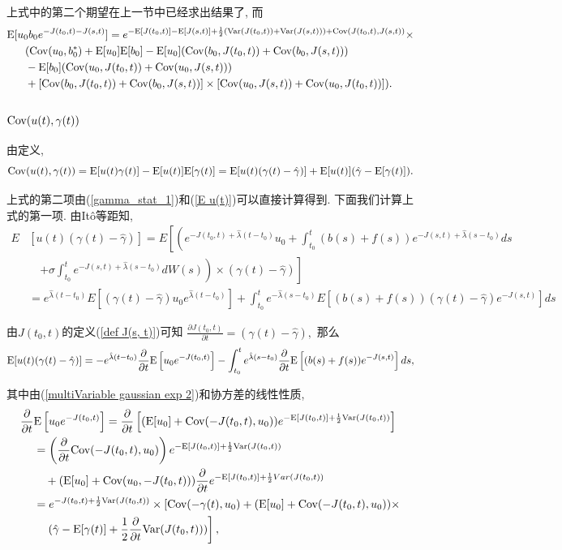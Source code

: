 \documentclass[notitlepage,cs4size,punct,oneside]{ctexrep}
\numberwithin{equation}{section}
\theoremstyle{mystyle}
\begin{document}
上式中的第二个期望在上一节中已经求出结果了, 而
\[
\begin{split}
\text{E}&[u_0b_0e^{-J(t_0, t)-J(s, t)}] = e^{-\text{E}[J(t_0, t)]-\text{E}[J(s, t)]+\frac{1}{2}(\text{Var}(J(t_0, t))+\text{Var}(J(s, t)))+\text{Cov}(J(t_0, t), J(s, t))}\times \\
&\quad (\text{Cov}(u_0, b_0^*)+\text{E}[u_0]\text{E}[b_0]-\text{E}[u_0](\text{Cov}(b_0, J(t_0, t))+\text{Cov}(b_0, J(s, t)))\\
&\quad -\text{E}[b_0](\text{Cov}(u_0, J(t_0, t))+\text{Cov}(u_0, J(s, t)))\\
&\quad +[\text{Cov}(b_0, J(t_0, t))+\text{Cov}(b_0, J(s, t))]\times[\text{Cov}(u_0, J(s, t))+\text{Cov}(u_0, J(t_0, t))]).
\end{split}
\]

\subsubsection{$\text{Cov}(u(t), \gamma(t))$}
由定义,
\[
\text{Cov}(u(t), \gamma(t)) = \text{E}[u(t)\gamma(t)] - \text{E}[u(t)]\text{E}[\gamma(t)] = \text{E}[u(t)(\gamma(t)-\hat\gamma)] + \text{E}[u(t)](\hat\gamma-\text{E}[\gamma(t)]). 
\]

上式的第二项由(\ref{gamma_stat_1})和(\ref{E u(t)})可以直接计算得到. 下面我们计算上式的第一项. 由It\^o等距知,
\[
\begin{split}
E&[u(t)(\gamma(t)-\hat\gamma)] = E\left[\left(e^{-J(t_0, t)+\hat\lambda(t-t_0)}u_0+\int_{t_0}^t(b(s)+f(s))e^{-J(s, t)+\hat\lambda(s-t_0)}ds\right.\right. \\
&\quad \left.\left.+\sigma\int_{t_0}^t e^{-J(s, t)+\hat\lambda(s-t_0)}dW(s)\right)\times(\gamma(t)-\hat\gamma)\right] \\
&= e^{\hat\lambda(t-t_0)}E\left[(\gamma(t)-\hat\gamma)u_0e^{\hat\lambda(t-t_0)}\right]+\int_{t_0}^t e^{-\hat\lambda(s-t_0)}E\left[(b(s)+f(s))(\gamma(t)-\hat\gamma)e^{-J(s, t)}\right]ds
\end{split}
\]

由$J(t_0, t)$的定义(\ref{def J(s, t)})可知
$
\frac{\partial J(t_0, t)}{\partial t} = (\gamma(t)-\hat\gamma),
$
那么
\[
\text{E}[u(t)(\gamma(t)-\hat\gamma)] = -e^{\hat\lambda(t-t_0)}\frac{\partial}{\partial t}\text{E}\left[u_0e^{-J(t_0, t)}\right]-\int_{t_0}^t e^{\hat\lambda(s-t_0)}\frac{\partial}{\partial t}\text{E}\left[(b(s)+f(s))e^{-J(s, t)}\right]ds,
\]

其中由(\ref{multiVariable gaussian exp 2})和协方差的线性性质,
\[
\begin{split}
\frac{\partial}{\partial t}&\text{E}\left[u_0e^{-J(t_0, t)}\right] = \frac{\partial}{\partial t}\left[(\text{E}[u_0]+\text{Cov}(-J(t_0, t), u_0))e^{-\text{E}[J(t_0, t)]+\frac{1}{2}\text{Var}(J(t_0, t))}\right] \\
&= \left(\frac{\partial}{\partial t}\text{Cov}(-J(t_0, t), u_0)\right)e^{-\text{E}[J(t_0, t)]+\frac{1}{2}\text{Var}(J(t_0, t))} \\
&\quad + (\text{E}[u_0] + \text{Cov}(u_0, -J(t_0, t)))\frac{\partial}{\partial t}e^{-\text{E}[J(t_0, t)]+\frac{1}{2}Var(J(t_0, t))} \\
&= e^{-J(t_0, t)+\frac{1}{2}\text{Var}(J(t_0, t))}\times\left[\text{Cov}(-\gamma(t), u_0)+(\text{E}[u_0]+\text{Cov}(-J(t_0, t), u_0))\times\right. \\
&\quad \left.(\hat\gamma-\text{E}[\gamma(t)]+\frac{1}{2}\frac{\partial}{\partial t}\text{Var}(J(t_0, t)))\right],
\end{split}
\]
\end{document}
